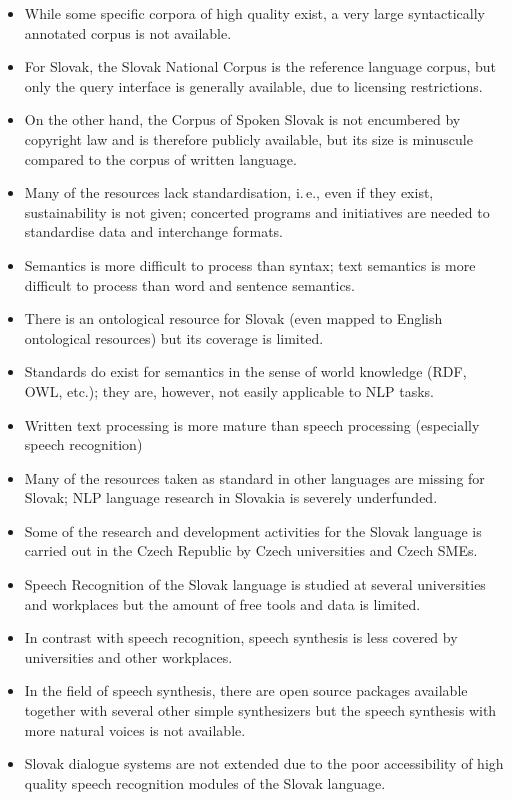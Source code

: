\begin{multicols}{2}
\begin{itemize}
\item While some specific corpora of high quality exist, a very large syntactically annotated corpus is not available.
\item For Slovak, the Slovak National Corpus is the reference language corpus, but only the query interface is generally available, due to licensing restrictions.
\item On the other hand, the Corpus of Spoken Slovak is not encumbered by copyright law and is therefore publicly available, but its size is minuscule compared to the corpus of written language.
\item Many of the resources lack standardisation, i.\,e., even if they exist, sustainability is not given; concerted programs and initiatives are needed to standardise data and interchange formats.
\item Semantics is more difficult to process than syntax; text semantics is more difficult to process than word and sentence semantics.
\item There is an ontological resource for Slovak (even mapped to English ontological resources) but its coverage is limited.
\item Standards do exist for semantics in the sense of world knowledge (RDF, OWL, etc.); they are, however, not easily applicable to NLP tasks.
\item Written text processing is more mature than speech processing (especially speech recognition)
\item Many of the resources taken as standard in other languages are missing for Slovak; NLP language research in Slovakia is severely underfunded.
\item Some of the research and development activities for the Slovak language is carried out in the Czech Republic by Czech universities and Czech SMEs.
\item Speech Recognition of the Slovak language is studied at several universities and workplaces but the amount of free tools and data is limited.
\item In contrast with speech recognition, speech synthesis is less covered by universities and other workplaces.
\item In the field of speech synthesis, there are open source packages available together with several other simple synthesizers but the speech synthesis with more natural voices is not available.
\item Slovak dialogue systems are not extended due to the poor accessibility of high quality speech recognition modules of the Slovak language.
\end{itemize}


\end{multicols}
